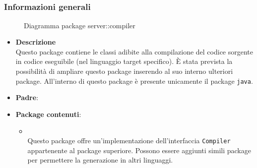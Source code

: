 \subsection{}
\label{\nogloxy{swedesigner::server::compiler}}
\subsubsection{Informazioni generali}
\begin{figure}[H]
	\caption{Diagramma package server::compiler}
\end{figure}
\begin{itemize}
\item \textbf{Descrizione}\\
Questo package contiene le classi adibite alla compilazione del codice sorgente in codice eseguibile (nel linguaggio target specifico). È stata prevista la possibilità di ampliare questo package inserendo al suo interno ulteriori package. All'interno di questo package è presente unicamente il package \texttt{java}.
\item \textbf{Padre}: \hyperref[\nogloxy{swedesigner::server}]{}
\item \textbf{Package contenuti}:
\begin{itemize}
\item \hyperref[\nogloxy{swedesigner::server::compiler::java}]{}\\
Questo package offre un'implementazione dell'interfaccia \texttt{Compiler} appartenente al package superiore. Possono essere aggiunti simili package per permettere la generazione in altri linguaggi.
\end{itemize}
\end{itemize}
